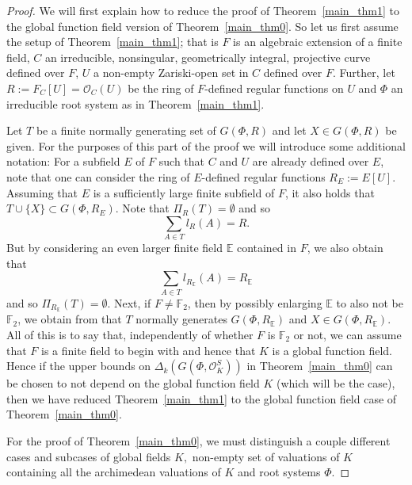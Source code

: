 \documentclass[12pt]{amsart}
\newcommand{\C}[1]{{\mathcal #1}}
\theoremstyle{definition}\newtheorem{definition}[theorem]{Definition}
\theoremstyle{remark}\newtheorem{remark}[theorem]{Remark}
\theoremstyle{definition}\newtheorem{case}{Case}
\begin{document}
\begin{proof}
We will first explain how to reduce the proof of Theorem~\ref{main_thm1} to the global function field version of Theorem~\ref{main_thm0}. So let us first assume the setup of Theorem~\ref{main_thm1}; that is $F$ is an algebraic extension of a finite field, $C$ an irreducible, nonsingular, geometrically integral, projective curve defined over $F$, $U$ a non-empty Zariski-open set in $C$ defined over $F$. Further, let $R:=F_C[U]=\mathscr{O}_C(U)$ be the ring of $F$-defined regular functions on $U$ and $\Phi$ an irreducible root system as in Theorem~\ref{main_thm1}. 

Let $T$ be a finite normally generating set of $G(\Phi,R)$ and let $X\in G(\Phi,R)$ be given. For the purposes of this part of the proof we will introduce some additional notation: For a subfield $E$ of $F$ such that $C$ and $U$ are already defined over $E$, note that one can consider the ring of $E$-defined regular functions $R_E:=E[U]$. Assuming that $E$ is a sufficiently large finite subfield of $F$, it also holds that $T\cup\{X\}\subset G(\Phi,R_E).$ Note that $\Pi_R(T)=\emptyset$ and so 
\[
\sum_{A\in T} l_R(A)=R.
\]
But by considering an even larger finite field $\mathbb{E}$ contained in $F$, we also obtain that 
\[
\sum_{A\in T} l_{R_{\mathbb{E}}}(A)=R_{\mathbb{E}}
\]
and so $\Pi_{R_{\mathbb{E}}}(T)=\emptyset.$ Next, if $F\neq\mathbb{F}_2$, then by possibly enlarging $\mathbb{E}$ to also not be $\mathbb{F}_2$, we obtain from \cite[Corollary~3.12]{General_strong_bound} that $T$ normally generates $G(\Phi,R_{\mathbb{E}})$ and $X\in G(\Phi,R_{\mathbb{E}}).$ All of this is to say that, independently of whether $F$ is $\mathbb{F}_2$ or not, we can assume that $F$ is a finite field to begin with and hence that $K$ is a global function field. Hence if the upper bounds on $\Delta_k(G(\Phi,\C O_K^S))$ in Theorem~\ref{main_thm0} can be chosen to not depend on the global function field $K$ (which will be the case), then we have reduced Theorem~\ref{main_thm1} to the global function field case of Theorem~\ref{main_thm0}.

For the proof of Theorem~\ref{main_thm0}, we must distinguish a couple different cases and subcases of global fields $K,$ non-empty set of valuations of $K$ containing all the archimedean valuations of $K$ and root systems $\Phi.$


\end{proof}
\end{document}
